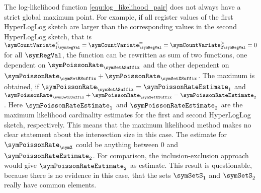 \documentclass[a4paper]{scrartcl}
\begin{document}
The log-likelihood function \eqref{equ:log_likelihood_pair} does not always have a strict global maximum point. For example, if all register values of the first HyperLogLog sketch are larger than the corresponding values in the second HyperLogLog sketch, that is $\symCountVariate_{1\symRegVal}^{<}
=
\symCountVariate_{\symRegVal}^{=}
=
\symCountVariate_{2\symRegVal}^{>}
=
0$ for all $\symRegVal$, the function can be rewritten as sum of two functions, one dependent on $\symPoissonRate_\symSetASuffix$ and the other dependent on $\symPoissonRate_\symSetBSuffix+\symPoissonRate_\symSetXSuffix$. 
The maximum is obtained, if $\symPoissonRate_\symSetASuffix = \symPoissonRateEstimate_1$ and $\symPoissonRate_\symSetBSuffix+\symPoissonRate_\symSetXSuffix = \symPoissonRateEstimate_2$. Here $\symPoissonRateEstimate_1$ and $\symPoissonRateEstimate_2$ are the maximum likelihood cardinality estimates for the first and second HyperLogLog sketch, respectively. This means that the maximum likelihood method makes no clear statement about the intersection size in this case. The estimate for $\symPoissonRate_\symX$ could be anything between 0 and $\symPoissonRateEstimate_2$. For comparison, the inclusion-exclusion approach would give $\symPoissonRateEstimate_2$ as estimate. This result is questionable, because there is no evidence in this case, that the sets $\symSetS_1$ and $\symSetS_2$ really have common elements.

\end{document}
